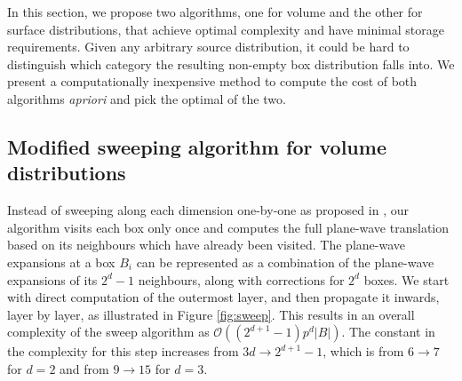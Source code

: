 In this section, we propose two algorithms, one for volume and the other for surface distributions, that achieve optimal complexity and have minimal storage requirements. Given any arbitrary source distribution, it could be hard to distinguish which category the resulting non-empty box distribution falls into. We present a computationally inexpensive method to compute the cost of both algorithms {\em apriori} and pick the optimal of the two. 




\subsection{Modified sweeping algorithm for volume distributions} 
\label{sec:sweep}

Instead of sweeping along each dimension one-by-one as proposed 
in \cite{fggt}, our algorithm visits each box only once and computes the full plane-wave
translation based on its neighbours which have already been visited. The
plane-wave expansions at a box $B_i$ can be represented as a combination of the
plane-wave expansions of its $2^{d} -1$ neighbours, along with corrections for
$2^d$ boxes. We start with direct computation of the outermost layer, and then propagate it inwards, layer by layer, as illustrated in Figure \ref{fig:sweep}. This results in an overall complexity of the sweep algorithm as $\mathcal{O}((2^{d+1} -1)p^d|B|)$. The constant in the
complexity for this step increases from $3d\rightarrow2^{d+1} - 1$, which is
from $6\rightarrow7$ for $d=2$ and from $9\rightarrow15$ for $d=3$. 

